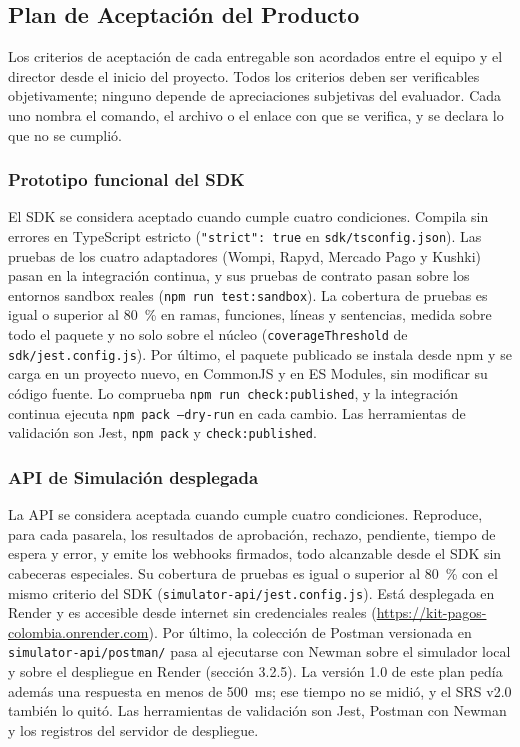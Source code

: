 \subsection{Plan de Aceptación del Producto}

Los criterios de aceptación de cada entregable son acordados entre el equipo y el director desde el inicio del proyecto. Todos los criterios deben ser verificables objetivamente; ninguno depende de apreciaciones subjetivas del evaluador. Cada uno nombra el comando, el archivo o el enlace con que se verifica, y se declara lo que no se cumplió.

\subsubsection{Prototipo funcional del SDK}

El SDK se considera aceptado cuando cumple cuatro condiciones. Compila sin errores en TypeScript estricto (\texttt{"strict": true} en \texttt{sdk/tsconfig.json}). Las pruebas de los cuatro adaptadores (Wompi, Rapyd, Mercado Pago y Kushki) pasan en la integración continua, y sus pruebas de contrato pasan sobre los entornos sandbox reales (\texttt{npm run test:sandbox}). La cobertura de pruebas es igual o superior al 80~\% en ramas, funciones, líneas y sentencias, medida sobre todo el paquete y no solo sobre el núcleo (\texttt{coverageThreshold} de \texttt{sdk/jest.config.js}). Por último, el paquete publicado se instala desde npm y se carga en un proyecto nuevo, en CommonJS y en ES Modules, sin modificar su código fuente. Lo comprueba \texttt{npm run check:published}, y la integración continua ejecuta \texttt{npm pack --dry-run} en cada cambio. Las herramientas de validación son Jest, \texttt{npm pack} y \texttt{check:published}.

\subsubsection{API de Simulación desplegada}

La API se considera aceptada cuando cumple cuatro condiciones. Reproduce, para cada pasarela, los resultados de aprobación, rechazo, pendiente, tiempo de espera y error, y emite los webhooks firmados, todo alcanzable desde el SDK sin cabeceras especiales. Su cobertura de pruebas es igual o superior al 80~\% con el mismo criterio del SDK (\texttt{simulator-api/jest.config.js}). Está desplegada en Render y es accesible desde internet sin credenciales reales (\url{https://kit-pagos-colombia.onrender.com}). Por último, la colección de Postman versionada en \texttt{simulator-api/postman/} pasa al ejecutarse con Newman sobre el simulador local y sobre el despliegue en Render (sección 3.2.5). La versión 1.0 de este plan pedía además una respuesta en menos de 500~ms; ese tiempo no se midió, y el SRS v2.0 también lo quitó. Las herramientas de validación son Jest, Postman con Newman y los registros del servidor de despliegue.

